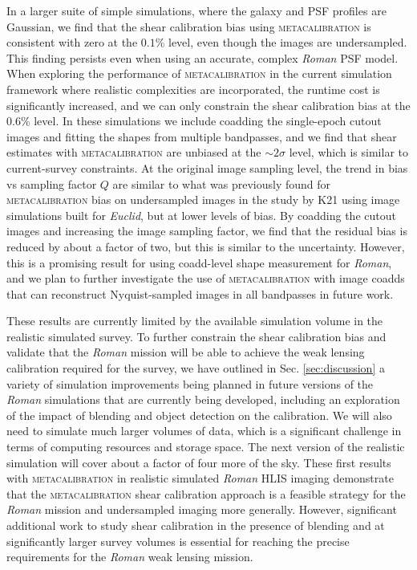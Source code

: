 \documentclass[fleqn,usenatbib]{mnras}
\begin{document}
In a larger suite of simple simulations, where the galaxy and PSF profiles are Gaussian, we find that the shear calibration bias using \textsc{metacalibration} is consistent with zero at the $0.1$\% level, even though the images are undersampled. This finding persists even when using an accurate, complex \emph{Roman} PSF model. When exploring the performance of \textsc{metacalibration} in the current simulation framework where realistic complexities are incorporated, the runtime cost is significantly increased, and we can only constrain the shear calibration bias at the $0.6$\% level. In these simulations we include coadding the single-epoch cutout images and fitting the shapes from multiple bandpasses, and we find that shear estimates with \textsc{metacalibration} are unbiased at the $\sim 2\sigma$ level, which is similar to current-survey constraints. At the original image sampling level, the trend in bias vs sampling factor $Q$ are similar to what was previously found for \textsc{metacalibration} bias on undersampled images in the study by K21 using image simulations built for \emph{Euclid}, but at lower levels of bias. By coadding the cutout images and increasing the image sampling factor, we find that the residual bias is reduced by about a factor of two, but this is similar to the uncertainty. However, this is a promising result for using coadd-level shape measurement for \emph{Roman}, and we plan to further investigate the use of \textsc{metacalibration} with image coadds that can reconstruct Nyquist-sampled images in all bandpasses in future work.

These results are currently limited by the available simulation volume in the realistic simulated survey. To further constrain the shear calibration bias and validate that the \emph{Roman} mission will be able to achieve the weak lensing calibration required for the survey, we have outlined in Sec. \ref{sec:discussion} a variety of simulation improvements being planned in future versions of the \emph{Roman} simulations that are currently being developed, including an exploration of the impact of blending and object detection on the calibration. We will also need to simulate much larger volumes of data, which is a significant challenge in terms of computing resources and storage space. The next version of the realistic simulation will cover about a factor of four more of the sky. These first results with \textsc{metacalibration} in realistic simulated \emph{Roman} HLIS imaging demonstrate that the \textsc{metacalibration} shear calibration approach is a feasible strategy for the \emph{Roman} mission and undersampled imaging more generally. However, significant additional work to study shear calibration in the presence of blending and at significantly larger survey volumes is essential for reaching the precise requirements for the \emph{Roman} weak lensing mission. 
\end{document}
